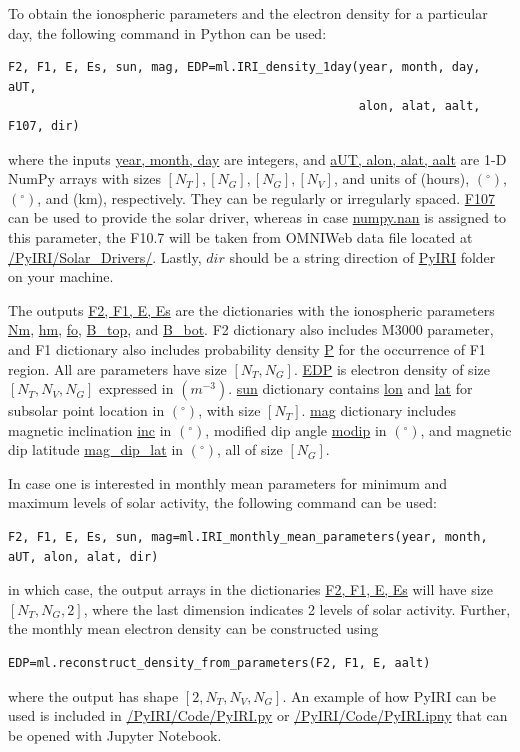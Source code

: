 \documentclass[draft]{agujournal2019}
\begin{document}
To obtain the ionospheric parameters and the electron density for a particular day, the following command in Python can be used:
\begin{verbatim}
F2, F1, E, Es, sun, mag, EDP=ml.IRI_density_1day(year, month, day, aUT, 
                                                 alon, alat, aalt, F107, dir)
\end{verbatim}
where the inputs \url{year, month, day} are integers, and \url{aUT, alon, alat, aalt} are 1-D NumPy arrays with sizes $[N_T], [N_G], [N_G], [N_V]$, and units of (hours), $(^{\circ})$, $(^{\circ})$, and (km), respectively. They can be regularly or irregularly spaced. \url{F107} can be used to provide the solar driver, whereas in case \url{numpy.nan} is assigned to this parameter, the F10.7 will be taken from OMNIWeb data file located at \url{/PyIRI/Solar_Drivers/}. Lastly, $dir$ should be a string direction of \url{PyIRI} folder on your machine. 

The outputs \url{F2, F1, E, Es} are the dictionaries with the ionospheric parameters \url{Nm}, \url{hm}, \url{fo}, \url{B_top}, and \url{B_bot}. F2 dictionary also includes M3000 parameter, and F1 dictionary also includes probability density \url{P} for the occurrence of F1 region. All are parameters have size $[N_T, N_G]$. \url{EDP} is electron density of size $[N_T, N_V, N_G]$ expressed in $(m^{-3})$. \url{sun} dictionary contains \url{lon} and \url{lat} for subsolar point location in $(^{\circ})$, with size $[N_T]$. \url{mag} dictionary includes magnetic inclination \url{inc} in $(^{\circ})$, modified dip angle \url{modip} in $(^{\circ})$, and magnetic dip latitude \url{mag_dip_lat} in $(^{\circ})$, all of size $[N_G]$. 

In case one is interested in monthly mean parameters for minimum and maximum levels of solar activity, the following command can be used:
\begin{verbatim}
F2, F1, E, Es, sun, mag=ml.IRI_monthly_mean_parameters(year, month, aUT, alon, alat, dir) 
\end{verbatim}
in which case, the output arrays in the dictionaries \url{F2, F1, E, Es} will have size $[N_T, N_G, 2]$, where the last dimension indicates 2 levels of solar activity. Further, the monthly mean electron density can be constructed using 
\begin{verbatim}
EDP=ml.reconstruct_density_from_parameters(F2, F1, E, aalt) 
\end{verbatim}
where the output has shape $[2, N_T, N_V, N_G]$. 
An example of how PyIRI can be used is included in \url{/PyIRI/Code/PyIRI.py} or \url{/PyIRI/Code/PyIRI.ipny} that can be opened with Jupyter Notebook. 
\end{document}
